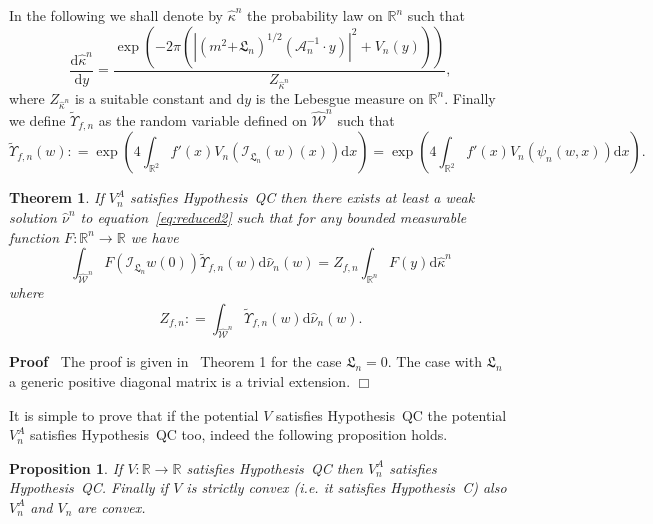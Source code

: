\documentclass[a4paper,10pt]{article}
\newcommand{\mathd}{\mathrm{d}}
\newenvironment{proof}{\noindent\textbf{Proof\ }}{\hspace*{\fill}$\Box$\medskip}
\newtheorem{proposition}{Proposition}
{\theorembodyfont{\rmfamily}\newtheorem{remark}{Remark}}
\newtheorem{theorem}{Theorem}
\begin{document}
In the following we shall denote by $\hat{\kappa}^n$ the probability law on
$\mathbb{R}^n$ such that
\[ \frac{\mathd \hat{\kappa}^n}{\mathd y} = \frac{\exp (- 2 \pi (| (m^2 +^{}
   \mathfrak{L}_n)^{1 / 2} (\mathcal{A}_n^{- 1} \cdot y) |^2 + V_n
   (y)))}{Z_{\hat{\kappa}^n}}, \]
where $Z_{\hat{\kappa}^n}$ is a suitable constant and $\mathd y$ is the
Lebesgue measure on $\mathbb{R}^n$. Finally we define $\tilde{\Upsilon}_{f,
n}$ as the random variable defined on $\widehat{\mathcal{W}}^n$ such that
\[ \tilde{\Upsilon}_{f, n} (w) : = \exp \left( 4 \int_{\mathbb{R}^2} f' (x)
   V_n (\mathcal{I}_{\mathfrak{L}_n} (w) (x)) \mathd x \right) = \exp \left( 4
   \int_{\mathbb{R}^2} f' (x) V_n^{} (\psi_n (w, x)) \mathd x \right) . \]
\begin{theorem}
  \label{theorem:reduced1}If $V^A_n$ satisfies Hypothesis~QC then there exists
  at least a weak solution $\hat{\nu}^n$ to equation~{\eqref{eq:reduced2}}
  such that for any bounded measurable function $F : \mathbb{R}^n \rightarrow
  \mathbb{R}$ we have
  \begin{equation}
    \int_{\widehat{\mathcal{W}}^n} F (\mathcal{} \mathcal{I}_{\mathfrak{L}_n}
    w (0)) \tilde{\Upsilon}_{f, n} (w) \mathd \hat{\nu}_n (w) = Z_{f, n}
    \int_{\mathbb{R}^n} F (y) \mathd \hat{\kappa}^n \label{eq:reduced4}
  \end{equation}
  where
  \[ Z_{f, n} : = \int_{\widehat{\mathcal{W}}^n} \tilde{\Upsilon}_{f, n} (w)
     \mathd \hat{\nu}_n (w) . \]
\end{theorem}

\begin{proof}
  The proof is given in~{\cite{Albeverio2018elliptic}} Theorem 1 for the case
  $\mathfrak{L}_n = 0$. The case with $\mathfrak{L}_n$ a generic positive
  diagonal matrix is a trivial extension.
\end{proof}

It is simple to prove that if the potential $V$ satisfies Hypothesis~QC the
potential $V_n^A$ satisfies Hypothesis~QC too, indeed the following
proposition holds.

\begin{proposition}
  If $V : \mathbb{R} \rightarrow \mathbb{R}$ satisfies Hypothesis~QC then
  $V_n^A$ satisfies Hypothesis~QC. Finally if $V$ is strictly convex (i.e. it
  satisfies Hypothesis~C) also $V_n^A$ and $V_n$ are convex.
\end{proposition}
\end{document}
